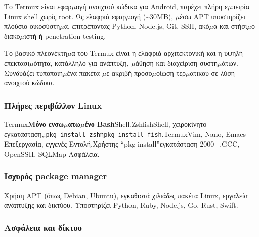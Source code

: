 


Το Termux είναι εφαρ$\mu$ογή ανοιχτού κώδικα για Android, παρέχει πλήρη ε$\mu$πειρία Linux shell χωρίς root. Ως ελαφριά εφαρ$\mu$ογή (\textasciitilde{}30MB), $\mu$έσω APT υποστηρίζει πλούσιο οικοσύστη$\mu$α, επιτρέποντας Python, Node.js, Git, SSH, ακό$\mu$α και στήσι$\mu$ο διακο$\mu$ιστή ή penetration testing.

Το βασικό πλεονέκτη$\mu$α του Termux είναι η ελαφριά αρχιτεκτονική και η υψηλή επεκτασι$\mu$ότητα, κατάλληλο για ανάπτυξη, $\mu$άθηση και διαχείριση συστη$\mu$άτων. Συνδυάζει τυποποιη$\mu$ένα πακέτα $\mu$ε ακριβή προσο$\mu$οίωση τερ$\mu$ατικού σε λύση ανοιχτού κώδικα.


\subsubsection*{Πλήρες περιβάλλον Linux}

Termux\textbf{Μόνο ενσω$\mu$ατω$\mu$ένο Bash}Shell.ZshfishShell, χειροκίνητο εγκατάσταση,:\texttt{pkg install zsh}ή\texttt{pkg install fish}.TermuxVim, Nano, Emacs Επεξεργασία, εγγενές Εντολή.Χρήστης “pkg install”εγκατάσταση 2000+,GCC, OpenSSH, SQLMap Ασφάλεια.

\subsubsection*{Ισχυρός package manager}

Χρήση APT (όπως Debian, Ubuntu), εγκαθιστά χιλιάδες πακέτα Linux, εργαλεία ανάπτυξης και δικτύου. Υποστηρίζει Python, Ruby, Node.js, Go, Rust, Swift.

\subsubsection*{Ασφάλεια και δίκτυο}

